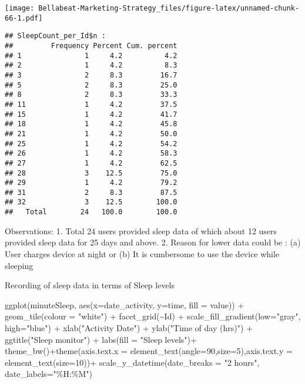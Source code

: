 \documentclass[
]{article}
\newenvironment{Shaded}{\begin{snugshade}}{\end{snugshade}}
\newcommand{\AttributeTok}[1]{\textcolor[rgb]{0.77,0.63,0.00}{#1}}
\newcommand{\DecValTok}[1]{\textcolor[rgb]{0.00,0.00,0.81}{#1}}
\newcommand{\FunctionTok}[1]{\textcolor[rgb]{0.00,0.00,0.00}{#1}}
\newcommand{\NormalTok}[1]{#1}
\newcommand{\SpecialCharTok}[1]{\textcolor[rgb]{0.00,0.00,0.00}{#1}}
\newcommand{\StringTok}[1]{\textcolor[rgb]{0.31,0.60,0.02}{#1}}
\begin{document}
\texttt{[image: Bellabeat-Marketing-Strategy\_files/figure-latex/unnamed-chunk-66-1.pdf]}

\begin{verbatim}
## SleepCount_per_Id$n : 
##         Frequency Percent Cum. percent
## 1               1     4.2          4.2
## 2               1     4.2          8.3
## 3               2     8.3         16.7
## 5               2     8.3         25.0
## 8               2     8.3         33.3
## 11              1     4.2         37.5
## 15              1     4.2         41.7
## 18              1     4.2         45.8
## 21              1     4.2         50.0
## 25              1     4.2         54.2
## 26              1     4.2         58.3
## 27              1     4.2         62.5
## 28              3    12.5         75.0
## 29              1     4.2         79.2
## 31              2     8.3         87.5
## 32              3    12.5        100.0
##   Total        24   100.0        100.0
\end{verbatim}

Observations: 1. Total 24 users provided sleep data of which about 12
users provided sleep data for 25 days and above. 2. Reason for lower
data could be : (a) User charges device at night or (b) It is cumbersome
to use the device while sleeping

Recording of sleep data in terms of Sleep levels

\begin{Shaded}
\begin{Highlighting}[]
\FunctionTok{ggplot}\NormalTok{(minuteSleep, }\FunctionTok{aes}\NormalTok{(}\AttributeTok{x=}\NormalTok{date\_activity, }\AttributeTok{y=}\NormalTok{time, }\AttributeTok{fill =}\NormalTok{ value)) }\SpecialCharTok{+} 
  \FunctionTok{geom\_tile}\NormalTok{(}\AttributeTok{colour =} \StringTok{"white"}\NormalTok{) }\SpecialCharTok{+} \FunctionTok{facet\_grid}\NormalTok{(}\SpecialCharTok{\textasciitilde{}}\NormalTok{Id) }\SpecialCharTok{+} \FunctionTok{scale\_fill\_gradient}\NormalTok{(}\AttributeTok{low=}\StringTok{"gray"}\NormalTok{, }\AttributeTok{high=}\StringTok{"blue"}\NormalTok{) }\SpecialCharTok{+}  \FunctionTok{xlab}\NormalTok{(}\StringTok{"Activity Date"}\NormalTok{) }\SpecialCharTok{+} \FunctionTok{ylab}\NormalTok{(}\StringTok{"Time of day (hrs)"}\NormalTok{) }\SpecialCharTok{+} \FunctionTok{ggtitle}\NormalTok{(}\StringTok{"Sleep monitor"}\NormalTok{) }\SpecialCharTok{+} \FunctionTok{labs}\NormalTok{(}\AttributeTok{fill =} \StringTok{"Sleep levels"}\NormalTok{)}\SpecialCharTok{+}
  \FunctionTok{theme\_bw}\NormalTok{()}\SpecialCharTok{+}\FunctionTok{theme}\NormalTok{(}\AttributeTok{axis.text.x =} \FunctionTok{element\_text}\NormalTok{(}\AttributeTok{angle=}\DecValTok{90}\NormalTok{,}\AttributeTok{size=}\DecValTok{5}\NormalTok{),}\AttributeTok{axis.text.y =} \FunctionTok{element\_text}\NormalTok{(}\AttributeTok{size=}\DecValTok{10}\NormalTok{))}\SpecialCharTok{+}
  \FunctionTok{scale\_y\_datetime}\NormalTok{(}\AttributeTok{date\_breaks =} \StringTok{"2 hours"}\NormalTok{, }\AttributeTok{date\_labels=}\StringTok{"\%H:\%M"}\NormalTok{)}
\end{Highlighting}
\end{Shaded}
\end{document}
